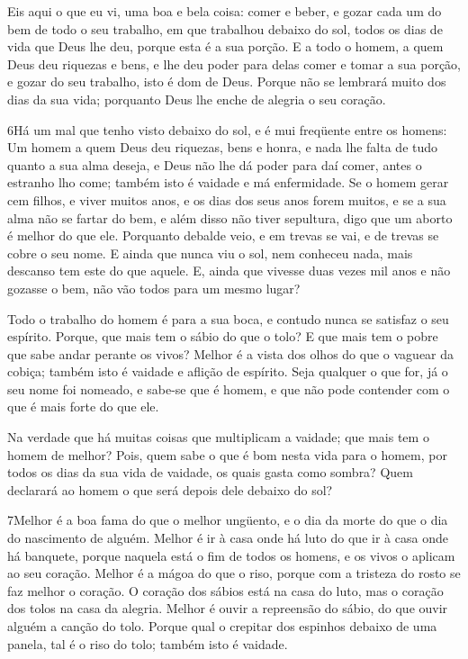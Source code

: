 Eis aqui o que eu vi, uma boa e bela coisa: comer e beber, e
gozar cada um do bem de todo o seu trabalho, em que trabalhou
debaixo do sol, todos os dias de vida que Deus lhe deu, porque esta
é a sua porção. E a todo o homem, a quem Deus deu riquezas e
bens, e lhe deu poder para delas comer e tomar a sua porção, e gozar
do seu trabalho, isto é dom de Deus. Porque não se lembrará
muito dos dias da sua vida; porquanto Deus lhe enche de alegria o
seu coração.

\medskip

\lettrine{6} Há um mal que tenho visto debaixo do sol, e é mui
freqüente entre os homens: Um homem a quem Deus deu riquezas,
bens e honra, e nada lhe falta de tudo quanto a sua alma deseja, e
Deus não lhe dá poder para daí comer, antes o estranho lho come;
também isto é vaidade e má enfermidade. Se o homem gerar cem
filhos, e viver muitos anos, e os dias dos seus anos forem muitos, e
se a sua alma não se fartar do bem, e além disso não tiver
sepultura, digo que um aborto é melhor do que ele. Porquanto
debalde veio, e em trevas se vai, e de trevas se cobre o seu nome.
E ainda que nunca viu o sol, nem conheceu nada, mais descanso
tem este do que aquele. E, ainda que vivesse duas vezes mil anos
e não gozasse o bem, não vão todos para um mesmo lugar?

Todo o trabalho do homem é para a sua boca, e contudo nunca se
satisfaz o seu espírito. Porque, que mais tem o sábio do que o
tolo? E que mais tem o pobre que sabe andar perante os vivos?
Melhor é a vista dos olhos do que o vaguear da cobiça; também
isto é vaidade e aflição de espírito. Seja qualquer o que
for, já o seu nome foi nomeado, e sabe-se que é homem, e que não
pode contender com o que é mais forte do que ele.

Na verdade que há muitas coisas que multiplicam a vaidade; que
mais tem o homem de melhor? Pois, quem sabe o que é bom nesta
vida para o homem, por todos os dias da sua vida de vaidade, os
quais gasta como sombra? Quem declarará ao homem o que será depois
dele debaixo do sol?

\medskip

\lettrine{7} Melhor é a boa fama do que o melhor ungüento, e o
dia da morte do que o dia do nascimento de alguém. Melhor é ir à
casa onde há luto do que ir à casa onde há banquete, porque naquela
está o fim de todos os homens, e os vivos o aplicam ao seu coração.
Melhor é a mágoa do que o riso, porque com a tristeza do rosto
se faz melhor o coração. O coração dos sábios está na casa do
luto, mas o coração dos tolos na casa da alegria. Melhor é ouvir
a repreensão do sábio, do que ouvir alguém a canção do tolo.
Porque qual o crepitar dos espinhos debaixo de uma panela, tal é
o riso do tolo; também isto é vaidade.

